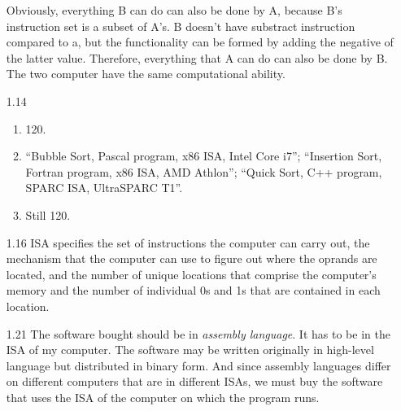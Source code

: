 \documentclass[a4paper]{article}
\begin{document}
\begin{enumerate}
  Obviously, everything B can do can also be done by A, because
  B's instruction set is a subset of A's. B doesn't have substract
  instruction compared to a, but the functionality can be formed by
  adding the negative of the latter value. Therefore, everything that
  A can do can also be done by B. The two computer have the same
  computational ability.
\item[1.14] 
\begin{enumerate}
\item 120.
\item ``Bubble Sort, Pascal program, x86 ISA, Intel Core i7'';
  ``Insertion Sort, Fortran program, x86 ISA, AMD Athlon''; ``Quick
  Sort, C++ program, SPARC ISA, UltraSPARC T1''.
\item Still 120.
\end{enumerate}
\item[1.16] ISA specifies the set of instructions the computer can
  carry out, the mechanism that the computer can use to figure out
  where the oprands are located, and the number of unique locations
  that comprise the computer's memory and the number of individual 0s
  and 1s that are contained in each location.
\item[1.21] The software bought should be in \textit{assembly
    language}. It has to be in the ISA of my computer. The software
  may be written originally in high-level language but distributed in
  binary form. And since assembly languages differ on different
  computers that are in different ISAs, we must buy the software that
  uses the ISA of the computer on which the program runs.
\end{enumerate}
\end{document}
